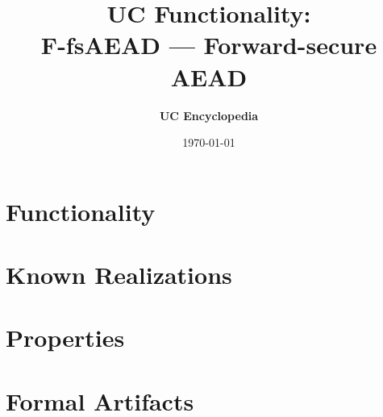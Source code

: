 \documentclass[11pt,a4paper]{article}
\title{\textbf{\Large UC Functionality:}\\[0.2em] \Large F-fsAEAD --- Forward-secure AEAD}
\author{\textbf{UC Encyclopedia}}
\date{\today}
\newtheorem{functionality}{Functionality}
\begin{document}
\maketitle

\begin{abstract}
\end{abstract}

\section{Functionality}

%

\section{Known Realizations}


\section{Properties}


\section{Formal Artifacts}

\end{document}
